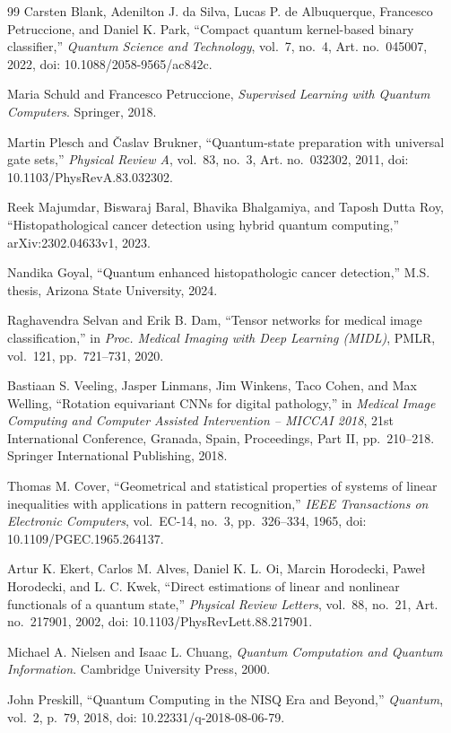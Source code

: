 \documentclass[conference]{IEEEtran}
\begin{document}
\begin{thebibliography}{99}
Carsten Blank, Adenilton J. da Silva, Lucas P. de Albuquerque, Francesco Petruccione, and Daniel K. Park, ``Compact quantum kernel-based binary classifier,'' \emph{Quantum Science and Technology}, vol.~7, no.~4, Art. no.~045007, 2022, doi: 10.1088/2058-9565/ac842c.

Maria Schuld and Francesco Petruccione, \emph{Supervised Learning with Quantum Computers}. Springer, 2018.

Martin Plesch and \v{C}aslav Brukner, ``Quantum-state preparation with universal gate sets,'' \emph{Physical Review A}, vol.~83, no.~3, Art. no.~032302, 2011, doi: 10.1103/PhysRevA.83.032302.

Reek Majumdar, Biswaraj Baral, Bhavika Bhalgamiya, and Taposh Dutta Roy, ``Histopathological cancer detection using hybrid quantum computing,'' arXiv:2302.04633v1, 2023.

Nandika Goyal, ``Quantum enhanced histopathologic cancer detection,'' M.S. thesis, Arizona State University, 2024.

Raghavendra Selvan and Erik B. Dam, ``Tensor networks for medical image classification,'' in \emph{Proc. Medical Imaging with Deep Learning (MIDL)}, PMLR, vol.~121, pp.~721--731, 2020.

Bastiaan S. Veeling, Jasper Linmans, Jim Winkens, Taco Cohen, and Max Welling, ``Rotation equivariant CNNs for digital pathology,'' in \emph{Medical Image Computing and Computer Assisted Intervention -- MICCAI 2018}, 21st International Conference, Granada, Spain, Proceedings, Part II, pp.~210--218. Springer International Publishing, 2018.

Thomas M. Cover, ``Geometrical and statistical properties of systems of linear inequalities with applications in pattern recognition,'' \emph{IEEE Transactions on Electronic Computers}, vol.~EC-14, no.~3, pp.~326--334, 1965, doi: 10.1109/PGEC.1965.264137.

Artur K. Ekert, Carlos M. Alves, Daniel K. L. Oi, Marcin Horodecki, Pawe{\l} Horodecki, and L. C. Kwek, ``Direct estimations of linear and nonlinear functionals of a quantum state,'' \emph{Physical Review Letters}, vol.~88, no.~21, Art. no.~217901, 2002, doi: 10.1103/PhysRevLett.88.217901.

Michael A. Nielsen and Isaac L. Chuang, \emph{Quantum Computation and Quantum Information}. Cambridge University Press, 2000.

John Preskill, ``Quantum Computing in the NISQ Era and Beyond,'' \emph{Quantum}, vol.~2, p.~79, 2018, doi: 10.22331/q-2018-08-06-79.

\end{thebibliography}
\end{document}
